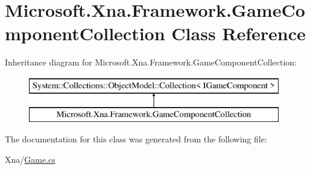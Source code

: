 \hypertarget{class_microsoft_1_1_xna_1_1_framework_1_1_game_component_collection}{}\section{Microsoft.\+Xna.\+Framework.\+Game\+Component\+Collection Class Reference}
\label{class_microsoft_1_1_xna_1_1_framework_1_1_game_component_collection}
Inheritance diagram for Microsoft.\+Xna.\+Framework.\+Game\+Component\+Collection\+:\begin{figure}[H]
\begin{center}
\leavevmode
\includegraphics[height=2.000000cm]{class_microsoft_1_1_xna_1_1_framework_1_1_game_component_collection}
\end{center}
\end{figure}


The documentation for this class was generated from the following file\+:\begin{DoxyCompactItemize}
\item 
Xna/\hyperlink{_game_8cs}{Game.\+cs}\end{DoxyCompactItemize}
